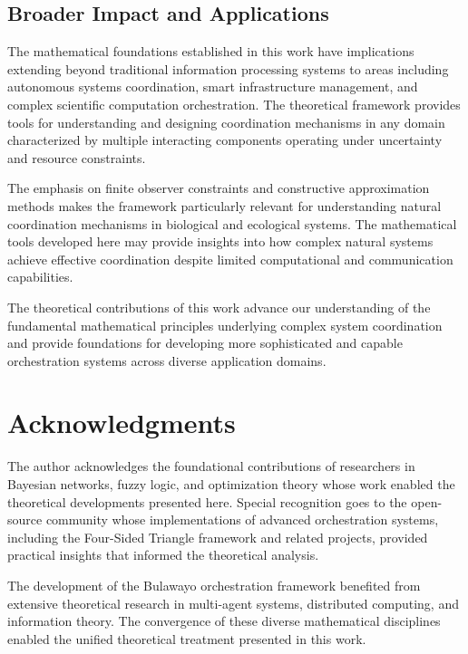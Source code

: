 \documentclass[12pt,a4paper]{article}
\begin{document}
\subsection{Broader Impact and Applications}

The mathematical foundations established in this work have implications extending beyond traditional information processing systems to areas including autonomous systems coordination, smart infrastructure management, and complex scientific computation orchestration. The theoretical framework provides tools for understanding and designing coordination mechanisms in any domain characterized by multiple interacting components operating under uncertainty and resource constraints.

The emphasis on finite observer constraints and constructive approximation methods makes the framework particularly relevant for understanding natural coordination mechanisms in biological and ecological systems. The mathematical tools developed here may provide insights into how complex natural systems achieve effective coordination despite limited computational and communication capabilities.

The theoretical contributions of this work advance our understanding of the fundamental mathematical principles underlying complex system coordination and provide foundations for developing more sophisticated and capable orchestration systems across diverse application domains.

\section{Acknowledgments}

The author acknowledges the foundational contributions of researchers in Bayesian networks, fuzzy logic, and optimization theory whose work enabled the theoretical developments presented here. Special recognition goes to the open-source community whose implementations of advanced orchestration systems, including the Four-Sided Triangle framework and related projects, provided practical insights that informed the theoretical analysis.

The development of the Bulawayo orchestration framework benefited from extensive theoretical research in multi-agent systems, distributed computing, and information theory. The convergence of these diverse mathematical disciplines enabled the unified theoretical treatment presented in this work.


\end{document}
